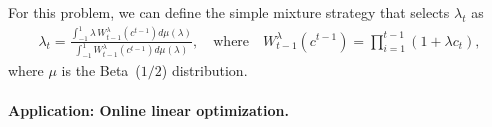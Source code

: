     For this problem, we can define the simple mixture strategy that selects $\lambda_t$ as 
    \begin{align}
        \lambda_t = \frac{ \int_{-1}^1 \lambda\, W_{t-1}^\lambda(c^{t-1}) d\mu(\lambda)} { \int_{-1}^1  W_{t-1}^\lambda(c^{t-1}) d\mu(\lambda)}, \quad \text{where} \quad W_{t-1}^\lambda(c^{t-1}) = \prod_{i=1}^{t-1} (1 + \lambda c_t ), 
    \end{align}
    where $\mu$ is the Beta~($1/2$) distribution. 

    \paragraph{Application: Online linear optimization.} 

